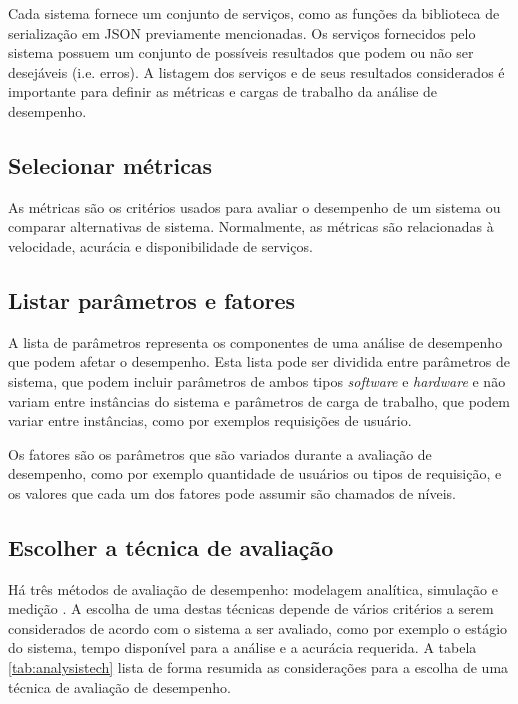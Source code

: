 Cada sistema fornece um conjunto de serviços, como as funções da biblioteca de serialização em JSON previamente mencionadas. Os serviços fornecidos pelo sistema possuem um conjunto de possíveis resultados que podem ou não ser desejáveis (i.e. erros). A listagem dos serviços e de seus resultados considerados é importante para definir as métricas e cargas de trabalho da análise de desempenho.

\subsection{Selecionar métricas}

As métricas são os critérios usados para avaliar o desempenho de um sistema ou comparar alternativas de sistema. Normalmente, as métricas são relacionadas à velocidade, acurácia e disponibilidade de serviços.

\subsection{Listar parâmetros e fatores}

A lista de parâmetros representa os componentes de uma análise de desempenho que podem afetar o desempenho. Esta lista pode ser dividida entre parâmetros de sistema, que podem incluir parâmetros de ambos tipos \textit{software} e \textit{hardware} e não variam entre instâncias do sistema e parâmetros de carga de trabalho, que podem variar entre instâncias, como por exemplos requisições de usuário.

Os fatores são os parâmetros que são variados durante a avaliação de desempenho, como por exemplo quantidade de usuários ou tipos de requisição, e os valores que cada um dos fatores pode assumir são chamados de níveis.

\subsection{Escolher a técnica de avaliação}

Há três métodos de avaliação de desempenho: modelagem analítica, simulação e medição \cite{jain1991art}. A escolha de uma destas técnicas depende de vários critérios a serem considerados de acordo com o sistema a ser avaliado, como por exemplo o estágio do sistema, tempo disponível para a análise e a acurácia requerida. A tabela \ref{tab:analysistech} lista de forma resumida as considerações para a escolha de uma técnica de avaliação de desempenho.

